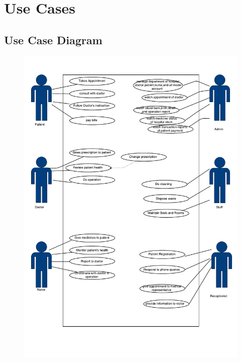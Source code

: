 \documentclass[14pt]{article}
\begin{document}
\section{Use Cases}
\subsection{Use Case Diagram }
\begin{figure}[h!]
\centering
  \includegraphics[width=14.5cm]{hospitalDiagram1.pdf}
\end{figure}
\newpage
\end{document}
